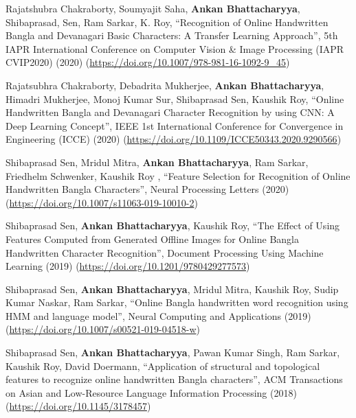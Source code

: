 \documentclass[letterpaper,10.8pt]{article}
\begin{document}
\item{
Rajatshubra Chakraborty, Soumyajit Saha, \textbf{Ankan Bhattacharyya}, Shibaprasad, Sen, Ram Sarkar, K. Roy, “Recognition of Online Handwritten Bangla and Devanagari
Basic Characters: A Transfer Learning Approach”, 5th IAPR International Conference on Computer Vision \& Image Processing (IAPR CVIP2020) (2020) (\href{https://doi.org/10.1007/978-981-16-1092-9_45}{https://doi.org/10.1007/978-981-16-1092-9\_45})
}

\item{
Rajatsubhra Chakraborty, Debadrita Mukherjee, \textbf{Ankan Bhattacharyya}, Himadri Mukherjee, Monoj Kumar Sur, Shibaprasad Sen, Kaushik Roy, “Online Handwritten Bangla and Devanagari Character Recognition by using CNN: A Deep Learning Concept”, IEEE 1st International Conference for Convergence in Engineering (ICCE) (2020) (\href{https://doi.org/10.1109/ICCE50343.2020.9290566}{https://doi.org/10.1109/ICCE50343.2020.9290566})
}

\item{
Shibaprasad Sen, Mridul Mitra, \textbf{Ankan Bhattacharyya}, Ram Sarkar, Friedhelm Schwenker, Kaushik Roy , “Feature Selection for Recognition of Online Handwritten Bangla Characters”, Neural Processing Letters (2020) (\href{https://doi.org/10.1007/s11063-019-10010-2}{https://doi.org/10.1007/s11063-019-10010-2})
}

\item{
Shibaprasad Sen, \textbf{Ankan Bhattacharyya}, Kaushik Roy, “The Effect of Using Features Computed from Generated Offline Images for Online Bangla Handwritten Character Recognition”, Document Processing Using Machine Learning (2019) (\href{https://doi.org/10.1201/9780429277573}{https://doi.org/10.1201/9780429277573})
}


\item{
Shibaprasad Sen, \textbf{Ankan Bhattacharyya}, Mridul Mitra, Kaushik Roy, Sudip Kumar Naskar, Ram Sarkar, “Online Bangla handwritten word recognition using HMM and language model”, Neural Computing and Applications (2019) (\href{https://doi.org/10.1007/s00521-019-04518-w}{https://doi.org/10.1007/s00521-019-04518-w})
}

\item{
Shibaprasad Sen, \textbf{Ankan Bhattacharyya}, Pawan Kumar Singh, Ram Sarkar, Kaushik Roy, David Doermann, “Application of structural and topological features to recognize online handwritten Bangla characters”, ACM Transactions on Asian and Low-Resource Language Information Processing (2018) (\href{https://doi.org/10.1145/3178457}{https://doi.org/10.1145/3178457})
}
\end{document}

